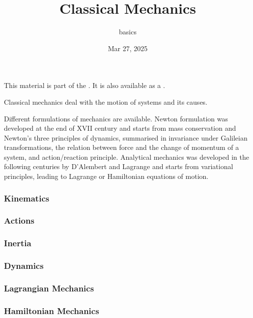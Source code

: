 \documentclass[letterpaper,10pt,english]{jupyterBook}
\title{Classical Mechanics}
\date{Mar 27, 2025}
\author{basics}
\begin{document}
\pagestyle{empty}
\sphinxmaketitle
\pagestyle{plain}
\sphinxtableofcontents
\pagestyle{normal}
\label{\detokenize{intro::doc}}


\sphinxAtStartPar
This material is part of the . It is also available as a .

\sphinxAtStartPar
Classical mechanics deal with the motion of systems and its causes.

\sphinxAtStartPar
Different formulations of mechanics are available. Newton formulation was developed at the end of XVII century and starts from mass conservation and Newton’s three principles of dynamics, summarised in invariance under Galileian transformations, the relation between force and the change of momentum of a system, and action/reaction principle. Analytical mechanics was developed in the following centuries by D’Alembert and Lagrange and starts from variational principles, leading to Lagrange or Hamiltonian equations of motion.

\sphinxAtStartPar
{}
\subsubsection*{Kinematics}
\subsubsection*{Actions}
\subsubsection*{Inertia}
\subsubsection*{Dynamics}

\sphinxAtStartPar
{}
\subsubsection*{Lagrangian Mechanics}
\subsubsection*{Hamiltonian Mechanics}
\end{document}
